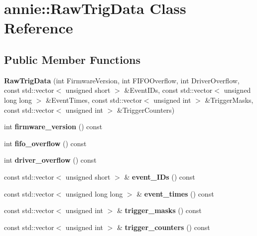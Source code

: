 \hypertarget{classannie_1_1RawTrigData}{
\section{annie::RawTrigData Class Reference}
\label{classannie_1_1RawTrigData}
}
\subsection*{Public Member Functions}
\begin{DoxyCompactItemize}
\item 
\hypertarget{classannie_1_1RawTrigData_a6ae63fa2f8b93d4b2316e44f916514ff}{
{\bfseries RawTrigData} (int FirmwareVersion, int FIFOOverflow, int DriverOverflow, const std::vector$<$ unsigned short $>$ \&EventIDs, const std::vector$<$ unsigned long long $>$ \&EventTimes, const std::vector$<$ unsigned int $>$ \&TriggerMasks, const std::vector$<$ unsigned int $>$ \&TriggerCounters)}
\label{classannie_1_1RawTrigData_a6ae63fa2f8b93d4b2316e44f916514ff}

\item 
\hypertarget{classannie_1_1RawTrigData_ae2a61506788dbdca9257979834e31864}{
int {\bfseries firmware\_\-version} () const }
\label{classannie_1_1RawTrigData_ae2a61506788dbdca9257979834e31864}

\item 
\hypertarget{classannie_1_1RawTrigData_a9049967c57b01c7c189b994ecb687ccf}{
int {\bfseries fifo\_\-overflow} () const }
\label{classannie_1_1RawTrigData_a9049967c57b01c7c189b994ecb687ccf}

\item 
\hypertarget{classannie_1_1RawTrigData_a83c9eb98baa8604cda1efbbbc70fcf30}{
int {\bfseries driver\_\-overflow} () const }
\label{classannie_1_1RawTrigData_a83c9eb98baa8604cda1efbbbc70fcf30}

\item 
\hypertarget{classannie_1_1RawTrigData_ae44ed716fb766936d37cc71245ad1b97}{
const std::vector$<$ unsigned short $>$ \& {\bfseries event\_\-IDs} () const }
\label{classannie_1_1RawTrigData_ae44ed716fb766936d37cc71245ad1b97}

\item 
\hypertarget{classannie_1_1RawTrigData_aaebd7b36ac26b831389af068e5298404}{
const std::vector$<$ unsigned long long $>$ \& {\bfseries event\_\-times} () const }
\label{classannie_1_1RawTrigData_aaebd7b36ac26b831389af068e5298404}

\item 
\hypertarget{classannie_1_1RawTrigData_afac7b8b1f6de24e63d09964b8d2eac78}{
const std::vector$<$ unsigned int $>$ \& {\bfseries trigger\_\-masks} () const }
\label{classannie_1_1RawTrigData_afac7b8b1f6de24e63d09964b8d2eac78}

\item 
\hypertarget{classannie_1_1RawTrigData_a3ae5db26f422e0b8bc4fb702e1017fc1}{
const std::vector$<$ unsigned int $>$ \& {\bfseries trigger\_\-counters} () const }
\label{classannie_1_1RawTrigData_a3ae5db26f422e0b8bc4fb702e1017fc1}

\end{DoxyCompactItemize}
